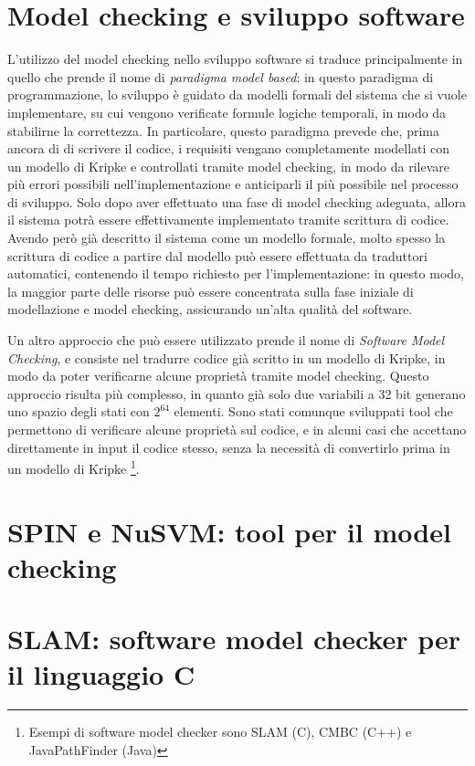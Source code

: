 \section{Model checking e sviluppo software}
L'utilizzo del model checking nello sviluppo software si traduce principalmente
in quello che prende il nome di \textit{paradigma model based}: in questo paradigma
di programmazione, lo sviluppo è guidato da modelli formali del sistema
che si vuole implementare, su cui vengono verificate formule logiche
temporali, in modo da stabilirne la correttezza.
In particolare, questo paradigma prevede che, prima ancora di
di scrivere il codice, i requisiti vengano completamente modellati
con un modello di Kripke e controllati tramite model checking, in modo da
rilevare più errori possibili nell'implementazione e anticiparli
il più possibile nel processo di sviluppo. Solo dopo aver effettuato una
fase di model checking adeguata, allora il sistema potrà essere effettivamente
implementato tramite scrittura di codice.
Avendo però già descritto il sistema come un modello formale, molto spesso
la scrittura di codice a partire dal modello può essere effettuata da
traduttori automatici, contenendo il tempo richiesto per l'implementazione:
in questo modo, la maggior parte delle risorse può essere concentrata
sulla fase iniziale di modellazione e model checking, assicurando un'alta
qualità del software.

Un altro approccio che può essere utilizzato prende il nome di
\textit{Software Model Checking}, e consiste nel tradurre codice già scritto
in un modello di Kripke, in modo da poter verificarne alcune proprietà
tramite model checking. Questo approccio risulta più complesso, in quanto
già solo due variabili a 32 bit generano uno spazio degli stati con $2^{64}$
elementi. Sono stati comunque sviluppati tool che permettono di verificare
alcune proprietà sul codice, e in alcuni casi che accettano direttamente
in input il codice stesso, senza la necessità di convertirlo prima in un
modello di Kripke
\footnote{Esempi di software model checker sono SLAM (C),
CMBC (C++) e JavaPathFinder (Java)}.\\

\section{SPIN e NuSVM: tool per il model checking}

\section{SLAM: software model checker per il linguaggio C}


